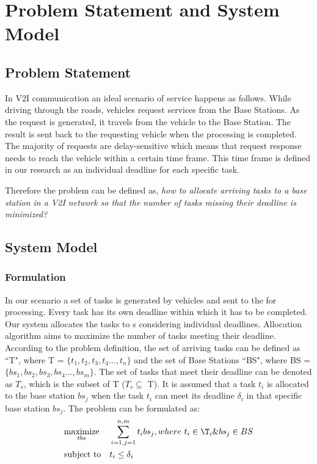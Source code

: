\section{Problem Statement and System Model}\label{sec:sysmodel}
\subsection{Problem Statement}
In V2I communication an ideal scenario of service happens as follows. While driving through the roads, vehicles request services from the Base Stations. As the request is generated, it travels from the vehicle to the Base Station. The result is sent back to the requesting vehicle when the processing is completed. The majority of requests are delay-sensitive which means that request response needs to reach the vehicle within a certain time frame. This time frame is defined in our research as an individual deadline for each specific task.

Therefore the problem can be defined as, \textit{how to allocate arriving tasks to a base station in a V2I network so that the number of tasks missing their deadline is minimized?}
\subsection{System Model}
\subsubsection{\textbf{Formulation}}
In our scenario a set of tasks is generated by vehicles and sent to the \bs for processing. Every task has its own deadline within which it has to be completed. Our system allocates the tasks to \bs s considering individual deadlines. Allocation algorithm aims to maximize the number of tasks meeting their deadline. According to the problem definition, the set of arriving tasks can be defined as ``T", where  T = $\{t_1, t_2, t_3, t_4\dots,t_n\}$ and the set of Base Stations ``BS", where BS = $\{bs_1, bs_2, bs_3, bs_4\dots,bs_m\}$. The set of tasks that meet their deadline can be denoted as $T_s$, which is the subset of T ($T_s \subseteq$ T). It is assumed that a task $t_i$ is allocated to the base station $bs_j$ when the task $t_i$ can meet its deadline $\delta_i$ in that specific base station $bs_j$. The problem can be formulated as:
\begin{equation*}
\begin{aligned}
&  \underset{tbs}{\text{maximize}}
& & \sum_{i=1,j=1}^{n,m} t_ibs_j , where~t_i \in \T_i \& bs_j \in BS\\
& \text{subject to}
& &  t_i \leq \delta_i\;
\end{aligned}
\end{equation*}

